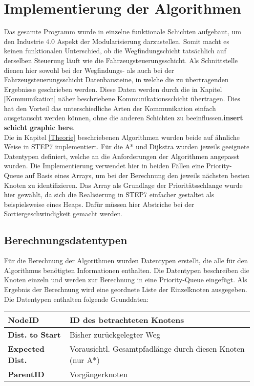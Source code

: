 	\section{Implementierung der Algorithmen}
	
		Das gesamte Programm wurde in einzelne funktionale Schichten aufgebaut, um den Industrie 4.0 Aspekt der Modularisierung darzustellen. Somit macht es keinen funktionalen Unterschied, ob die Wegfindungschicht tatsächlich auf derselben Steuerung läuft wie die Fahrzeugsteuerungsschicht. Als Schnittstelle dienen hier sowohl bei der Wegfindungs- als auch bei der Fahrzeugsteuerungsschicht  Datenbausteine, in welche die zu übertragenden Ergebnisse geschrieben werden. Diese Daten werden durch die in Kapitel \ref{Kommunikation} näher beschriebene Kommunikationsschicht übertragen. Dies hat den Vorteil das unterschiedliche Arten der Kommunikation einfach ausgetauscht werden können, ohne die anderen Schichten zu beeinflussen.\textbf{insert schicht graphic here}.\\
		
		Die in Kapitel \ref{Theorie} beschriebenen Algorithmen wurden beide auf ähnliche Weise in \ac{STEP7} implementiert. Für die A* und Dijkstra wurden jeweils geeignete Datentypen definiert, welche an die Anforderungen der Algorithmen angepasst wurden. Die Implementierung verwendet hier in beiden Fällen eine Priority-Queue auf Basis eines Arrays, um bei der Berechnung den jeweils nächsten besten Knoten zu identifizieren. Das Array als Grundlage der Prioritätsschlange wurde hier gewählt, da sich die Realisierung in \ac{STEP7} einfacher gestaltet als beispielsweise eines Heaps. Dafür müssen hier Abstriche bei der Sortiergeschwindigkeit gemacht werden.
		
		\subsection{Berechnungsdatentypen}
			\label{Datentypen_Berechnung}
			Für die Berechnung der Algorithmen wurden Datentypen erstellt, die alle für den Algorithmus benötigten Informationen enthalten. Die Datentypen beschreiben die Knoten einzeln und werden zur Berechnung in eine Priority-Queue eingefügt. Als Ergebnis der Berechnung wird eine geordnete Liste der Einzelknoten ausgegeben. Die Datentypen enthalten folgende Grunddaten:
			
			\begin{longtable}{| l | l |}
				\hline
				\textbf{NodeID} & ID des betrachteten Knotens\\ \hline
				\textbf{Dist. to Start} & Bisher zurückgelegter Weg\\ \hline
				\textbf{Expected Dist.} & Vorausichtl. Gesamtpfadlänge durch diesen Knoten (nur A*)\\ \hline
				\textbf{ParentID} & Vorgängerknoten\\
				\hline
			\end{longtable}
			
